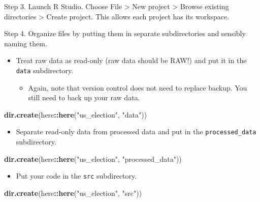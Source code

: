 \documentclass[
]{book}
\newenvironment{Shaded}{\begin{snugshade}}{\end{snugshade}}
\newcommand{\KeywordTok}[1]{\textcolor[rgb]{0.13,0.29,0.53}{\textbf{#1}}}
\newcommand{\NormalTok}[1]{#1}
\newcommand{\OperatorTok}[1]{\textcolor[rgb]{0.81,0.36,0.00}{\textbf{#1}}}
\newcommand{\StringTok}[1]{\textcolor[rgb]{0.31,0.60,0.02}{#1}}
\providecommand{\tightlist}{%
  \setlength{\itemsep}{0pt}\setlength{\parskip}{0pt}}
\begin{document}
Step 3. Launch R Studio. Choose File \textgreater{} New project \textgreater{} Browse existing directories \textgreater{} Create project. This allows each project has its workspace.

Step 4. Organize files by putting them in separate subdirectories and sensibly naming them.

\begin{itemize}
\item
  Treat raw data as read-only (raw data should be RAW!) and put it in the \texttt{data} subdirectory.

  \begin{itemize}
  \tightlist
  \item
    Again, note that version control does not need to replace backup. You still need to back up your raw data.
  \end{itemize}
\end{itemize}

\begin{Shaded}
\begin{Highlighting}[]
\KeywordTok{dir.create}\NormalTok{(here}\OperatorTok{::}\KeywordTok{here}\NormalTok{(}\StringTok{"us\_election"}\NormalTok{, }\StringTok{"data"}\NormalTok{))}
\end{Highlighting}
\end{Shaded}

\begin{itemize}
\tightlist
\item
  Separate read-only data from processed data and put in the \texttt{processed\_data} subdirectory.
\end{itemize}

\begin{Shaded}
\begin{Highlighting}[]
\KeywordTok{dir.create}\NormalTok{(here}\OperatorTok{::}\KeywordTok{here}\NormalTok{(}\StringTok{"us\_election"}\NormalTok{, }\StringTok{"processed\_data"}\NormalTok{))}
\end{Highlighting}
\end{Shaded}

\begin{itemize}
\tightlist
\item
  Put your code in the \texttt{src} subdirectory.
\end{itemize}

\begin{Shaded}
\begin{Highlighting}[]
\KeywordTok{dir.create}\NormalTok{(here}\OperatorTok{::}\KeywordTok{here}\NormalTok{(}\StringTok{"us\_election"}\NormalTok{, }\StringTok{"src"}\NormalTok{))}
\end{Highlighting}
\end{Shaded}
\end{document}
